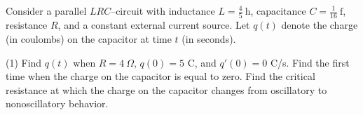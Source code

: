 \begin{Exercise}[title={Mixed Spring Mass and Electrical Network Systems}]
%	
%		
%		
%		
%		
%		
%		
%		
%		
%		
	
	\Question\label{3-6-7} Consider a parallel $LRC$–circuit with inductance $L=\frac{4}{5}\ \text{h}$, capacitance 
	$C=\frac{1}{16}\ \text{f}$, resistance $R$, and a constant external  current source.  
	Let $q(t)$ denote the charge (in coulombs) on the capacitor at time $t$ (in seconds).
	\begin{tasks}(1)
		\task Find $q(t)$ when $R=4\ \Omega$, $q(0)=5$ C, and $q'(0)=0$ C/s.
		\task Find the first time when the charge on the capacitor is equal to zero.
		\task Find the critical resistance at which the charge on the capacitor  changes from
		oscillatory to nonoscillatory behavior.
	\end{tasks}
	

\end{Exercise}
